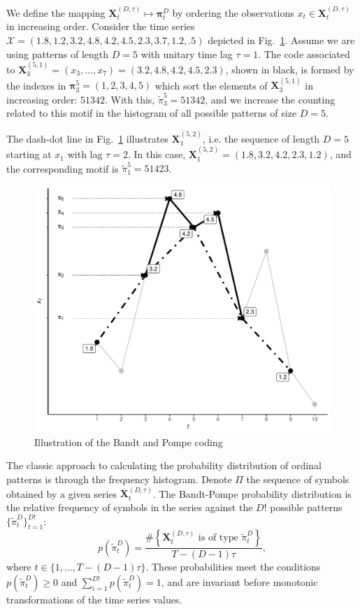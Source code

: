 \documentclass[journal]{IEEEtran}
\begin{document}
We define the mapping ${\mathbf X}_t^{(D,\tau)} \mapsto {\mathbf \pi}_t^{D}$ by ordering the observations $x_t \in {\mathbf X}_t^{(D,\tau)}$ in increasing order.
Consider the time series $\mathcal X = (1.8, 1.2, 3.2, 4.8, 4.2, 4.5, 2.3, 3.7, 1.2, .5)$ depicted in Fig.~\ref{Fig:IntroBP}.
Assume we are using patterns of length $D=5$ with unitary time lag $\tau=1$.
The code associated to $\mathbf X_{3}^{(5,1)}=(x_3,\dots,x_7)=(3.2, 4.8, 4.2, 4.5, 2.3)$, shown in black, is formed by the indexes in $\bm\pi_3^{5}=(1,2,3,4,5)$ which sort the elements of $\mathbf X_{3}^{(5,1)}$ in increasing order: $51342$.
With this, $\widetilde{\pi}_3^{5} = 51342$, and we increase the counting related to this motif in the histogram of all possible patterns of size $D=5$.

The dash-dot line in Fig.~\ref{Fig:IntroBP} illustrates $\mathbf X_{1}^{(5,2)}$, i.e. the sequence of length $D=5$ starting at $x_1$ with lag $\tau=2$.
In this case, $\mathbf X_{1}^{(5,2)}= (1.8, 3.2, 4.2, 2.3, 1.2)$, and the corresponding motif is $\widetilde{\pi}_1^{5}=51423$.

\begin{figure}[hbt]
	\centering
	\includegraphics[width=.9\linewidth]{Figures/IntroBP.pdf}
	\caption{Illustration of the Bandt and Pompe coding\label{Fig:IntroBP}}
\end{figure}

The classic approach to calculating the probability distribution of ordinal patterns is through the frequency histogram.
Denote $\Pi$ the sequence of symbols obtained by a given series $\mathbf{X}_t^{(D,\tau)}$.
The Bandt-Pompe probability distribution is the relative frequency of symbols in the series against the $D!$ possible patterns $\{\widetilde\pi_t^D \}_{t = 1}^{D!}$:
\begin{equation}
p(\widetilde\pi_t^D) = \frac{\#\left \{\mathbf{X}_t^{(D,\tau)} \text{ is of type } \widetilde\pi_t^D\right \}}{T- (D-1)\tau},  
\end{equation}
where  $t\in \{1, \dots, T-(D-1)\tau\}$.
These probabilities meet the conditions $p(\widetilde\pi_t^D) \ge 0$ and  $\sum_{i=1}^{D!} p(\widetilde\pi_t^D) = 1$, and are invariant before monotonic transformations of the time series values.
\end{document}
